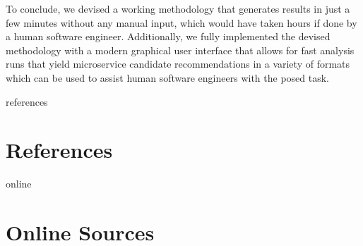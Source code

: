 \documentclass[12pt,a4paper]{report}
\begin{document}
To conclude, we devised a working methodology that generates results
in just a few minutes without any manual input,
which would have taken hours if done by a human software engineer.
Additionally, we fully implemented the devised methodology with a
modern graphical user interface that allows for fast analysis runs
that yield microservice candidate recommendations in a variety of formats
which can be used to assist human software engineers with the posed task.




\newpage
{}
\listoffigures
\newpage
{}
\listoftables
\newpage
{}

\begin{btSect}{references}
\section*{\huge{References}}
\btPrintCited
\end{btSect}
\begin{btSect}{online}
\section*{\huge{Online Sources}}
\btPrintCited
\end{btSect}
\end{document}
